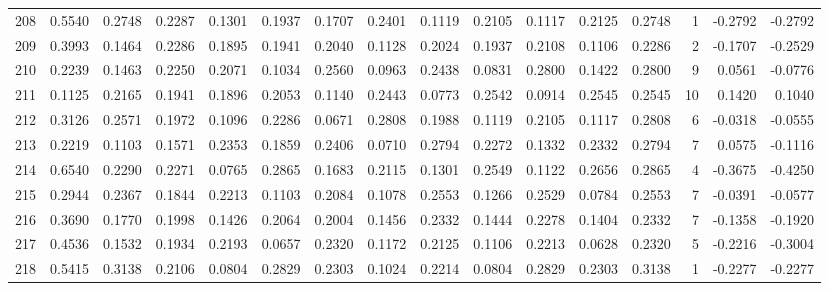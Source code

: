\begin{tabular}{lrrrrrrrrrrrrrrr}
208 &      0.5540 &  0.2748 &  0.2287 &  0.1301 &  0.1937 &  0.1707 &  0.2401 &  0.1119 &  0.2105 &  0.1117 &   0.2125 &     0.2748 &      1 &                   -0.2792 &                    -0.2792 \\
209 &      0.3993 &  0.1464 &  0.2286 &  0.1895 &  0.1941 &  0.2040 &  0.1128 &  0.2024 &  0.1937 &  0.2108 &   0.1106 &     0.2286 &      2 &                   -0.1707 &                    -0.2529 \\
210 &      0.2239 &  0.1463 &  0.2250 &  0.2071 &  0.1034 &  0.2560 &  0.0963 &  0.2438 &  0.0831 &  0.2800 &   0.1422 &     0.2800 &      9 &                    0.0561 &                    -0.0776 \\
211 &      0.1125 &  0.2165 &  0.1941 &  0.1896 &  0.2053 &  0.1140 &  0.2443 &  0.0773 &  0.2542 &  0.0914 &   0.2545 &     0.2545 &     10 &                    0.1420 &                     0.1040 \\
212 &      0.3126 &  0.2571 &  0.1972 &  0.1096 &  0.2286 &  0.0671 &  0.2808 &  0.1988 &  0.1119 &  0.2105 &   0.1117 &     0.2808 &      6 &                   -0.0318 &                    -0.0555 \\
213 &      0.2219 &  0.1103 &  0.1571 &  0.2353 &  0.1859 &  0.2406 &  0.0710 &  0.2794 &  0.2272 &  0.1332 &   0.2332 &     0.2794 &      7 &                    0.0575 &                    -0.1116 \\
214 &      0.6540 &  0.2290 &  0.2271 &  0.0765 &  0.2865 &  0.1683 &  0.2115 &  0.1301 &  0.2549 &  0.1122 &   0.2656 &     0.2865 &      4 &                   -0.3675 &                    -0.4250 \\
215 &      0.2944 &  0.2367 &  0.1844 &  0.2213 &  0.1103 &  0.2084 &  0.1078 &  0.2553 &  0.1266 &  0.2529 &   0.0784 &     0.2553 &      7 &                   -0.0391 &                    -0.0577 \\
216 &      0.3690 &  0.1770 &  0.1998 &  0.1426 &  0.2064 &  0.2004 &  0.1456 &  0.2332 &  0.1444 &  0.2278 &   0.1404 &     0.2332 &      7 &                   -0.1358 &                    -0.1920 \\
217 &      0.4536 &  0.1532 &  0.1934 &  0.2193 &  0.0657 &  0.2320 &  0.1172 &  0.2125 &  0.1106 &  0.2213 &   0.0628 &     0.2320 &      5 &                   -0.2216 &                    -0.3004 \\
218 &      0.5415 &  0.3138 &  0.2106 &  0.0804 &  0.2829 &  0.2303 &  0.1024 &  0.2214 &  0.0804 &  0.2829 &   0.2303 &     0.3138 &      1 &                   -0.2277 &                    -0.2277 \\

\end{tabular}
